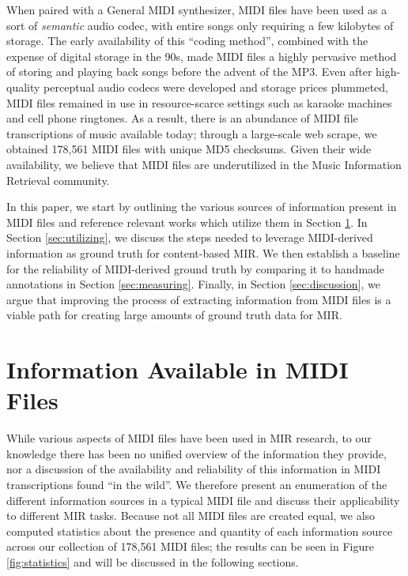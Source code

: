 \documentclass{article}
\begin{document}
When paired with a General MIDI synthesizer, MIDI files have been used as a sort of {\em semantic} audio codec, with entire songs only requiring a few kilobytes of storage.
The early availability of this ``coding method'', combined with the expense of digital storage in the 90s, made MIDI files a highly pervasive method of storing and playing back songs before the advent of the MP3.
Even after high-quality perceptual audio codecs were developed and storage prices plummeted, MIDI files remained in use in resource-scarce settings such as karaoke machines and cell phone ringtones.
As a result, there is an abundance of MIDI file transcriptions of music available today; through a large-scale web scrape, we obtained 178,561 MIDI files with unique MD5 checksums.  
Given their wide availability, we believe that MIDI files are underutilized in the Music Information Retrieval community.

In this paper, we start by outlining the various sources of information present in MIDI files and reference relevant works which utilize them in Section \ref{sec:information}.
In Section \ref{sec:utilizing}, we discuss the steps needed to leverage MIDI-derived information as ground truth for content-based MIR.
We then establish a baseline for the reliability of MIDI-derived ground truth by comparing it to handmade annotations in Section \ref{sec:measuring}.
Finally, in Section \ref{sec:discussion}, we argue that improving the process of extracting information from MIDI files is a viable path for creating large amounts of ground truth data for MIR.

\section{Information Available in MIDI Files}
\label{sec:information}

While various aspects of MIDI files have been used in MIR research, to our knowledge there has been no unified overview of the information they provide, nor a discussion of the availability and reliability of this information in MIDI transcriptions found ``in the wild''.
We therefore present an enumeration of the different information sources in a typical MIDI file and discuss their applicability to different MIR tasks.
Because not all MIDI files are created equal, we also computed statistics about the presence and quantity of each information source across our collection of 178,561 MIDI files; the results can be seen in Figure \ref{fig:statistics} and will be discussed in the following sections.
\end{document}
